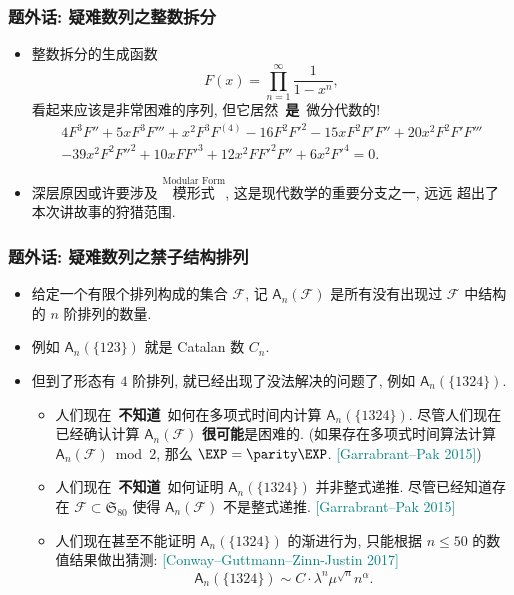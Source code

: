 \documentclass{ctexbeamer}
\newcommand{\cnote}[2][\footnotesize]{\textcolor{teal}{#1[#2]}}
\begin{document}
\begin{frame}
  \frametitle{题外话: 疑难数列之整数拆分}

  \begin{itemize}
    \item 整数拆分的生成函数
    \begin{equation}
      F(x) = \prod_{n=1}^\infty \frac 1{1-x^n},
    \end{equation}
    \pause
    看起来应该是非常困难的序列, 但它居然~\textbf{是}~微分代数的!
    \begin{multline}
      4F^3 F'' + 5x F^3 F''' + x^2 F^3 F^{(4)} - 16F^2 F'^2  - 15x F^2 F' F'' + 20x^2 F^2 F' F'''\\
       - 39x^2 F^2 F''^2 + 10x F F'^3  + 12x^2 F F'^2 F'' + 6x^2 F'^4 = 0.
    \end{multline}
    \pause
    \item 深层原因或许要涉及 $\stackrel{\text{Modular Form}}{\text{模形式}}$, 这是现代数学的重要分支之一, 远远
    超出了本次讲故事的狩猎范围.
  \end{itemize}

\end{frame}

\begin{frame}
  \frametitle{题外话: 疑难数列之禁子结构排列}

  \begin{itemize}
    \item 给定一个有限个排列构成的集合 $\mathcal F$, 记 $\mathsf A_n(\mathcal F)$ 是所有没有出现过
    $\mathcal F$ 中结构的 $n$ 阶排列的数量.
    \pause
    \item 例如 $\mathsf A_n(\{123\})$ 就是 Catalan 数 $C_n$.
    \pause
    \item 但到了形态有 $4$ 阶排列, 就已经出现了没法解决的问题了, 例如 $\mathsf A_n(\{1324\})$.
    \begin{itemize}
      \pause
      \item 人们现在~\textbf{不知道}~如何在多项式时间内计算 $\mathsf A_n(\{1324\})$. 
      尽管人们现在已经确认计算 $\mathsf A_n(\mathcal F)$ \textbf{很可能}是困难的.
      (如果存在多项式时间算法计算 $\mathsf A_n(\mathcal F)\bmod 2$, 那么 $\EXP = \parity\EXP$.
      \cnote{Garrabrant--Pak 2015})
      \pause
      \item 人们现在~\textbf{不知道}~如何证明 $\mathsf A_n(\{1324\})$ 并非整式递推.
      尽管已经知道存在 $\mathcal F \subset \mathfrak S_{80}$ 使得 $\mathsf A_n(\mathcal F)$ 不是整式递推.
      \cnote{Garrabrant--Pak 2015}
      \pause
      \item 人们现在甚至不能证明 $\mathsf A_n(\{1324\})$ 的渐进行为, 只能根据 $n\leq 50$ 的数值结果做出猜测:
      \cnote{Conway--Guttmann--Zinn-Justin 2017}
      \begin{equation}
        \mathsf A_n(\{1324\}) \sim C \cdot \lambda^n \mu^{\sqrt n} n^\alpha.
      \end{equation}
    \end{itemize}
  \end{itemize}

\end{frame}
\end{document}
